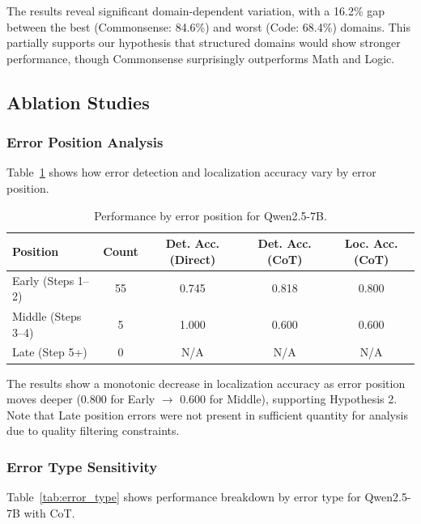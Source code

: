 \documentclass{article}
\begin{document}
The results reveal significant domain-dependent variation, with a 16.2\% gap between the best (Commonsense: 84.6\%) and worst (Code: 68.4\%) domains. This partially supports our hypothesis that structured domains would show stronger performance, though Commonsense surprisingly outperforms Math and Logic.

\subsection{Ablation Studies}

\subsubsection{Error Position Analysis}

Table~\ref{tab:position} shows how error detection and localization accuracy vary by error position.

\begin{table}[t]
\caption{Performance by error position for Qwen2.5-7B.}
\label{tab:position}
\centering
\begin{tabular}{lcccc}
\toprule
\textbf{Position} & \textbf{Count} & \textbf{Det. Acc. (Direct)} & \textbf{Det. Acc. (CoT)} & \textbf{Loc. Acc. (CoT)} \\
\midrule
Early (Steps 1--2) & 55 & 0.745 & 0.818 & 0.800 \\
Middle (Steps 3--4) & 5 & 1.000 & 0.600 & 0.600 \\
Late (Step 5+) & 0 & N/A & N/A & N/A \\
\bottomrule
\end{tabular}
\end{table}

The results show a monotonic decrease in localization accuracy as error position moves deeper (0.800 for Early $\rightarrow$ 0.600 for Middle), supporting Hypothesis 2. Note that Late position errors were not present in sufficient quantity for analysis due to quality filtering constraints.

\subsubsection{Error Type Sensitivity}

Table~\ref{tab:error_type} shows performance breakdown by error type for Qwen2.5-7B with CoT.
\end{document}
